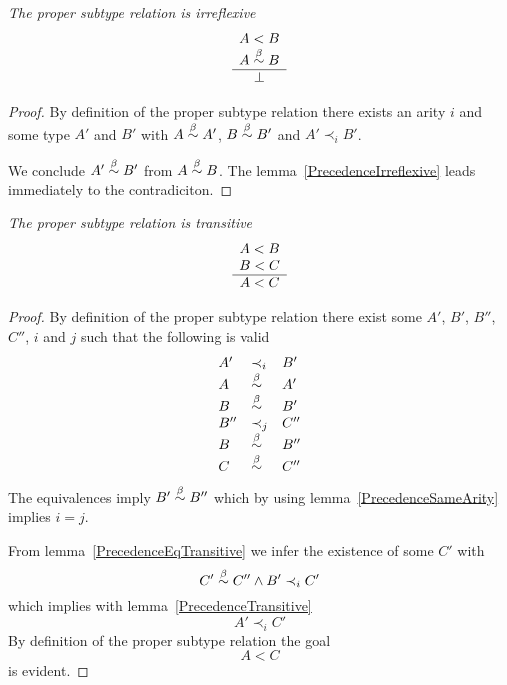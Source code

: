 \begin{theorem}
    \label{ProperSubtypeIrreflexive}
    \emph{The proper subtype relation is irreflexive}
    $$
    \begin{array}{c} 
        A < B
        \\
        A \stackrel{\beta}{\sim} B
     \\ \hline \perp\end{array}
    $$

    \begin{proof}
        By definition of the proper subtype relation there exists an arity $i$ and
        some type $A'$ and $B'$ with $A \stackrel{\beta}{\sim} A'$, $B \stackrel{\beta}{\sim} B'$ and $A'
        \prec_i B'$.

        We conclude $A' \stackrel{\beta}{\sim} B'$ from $A \stackrel{\beta}{\sim} B$. The
        lemma~\ref{PrecedenceIrreflexive} leads immediately to the
        contradiciton.
    \end{proof}
\end{theorem}





\begin{theorem}
    \label{ProperSubtypeTransitive}
    \emph{The proper subtype relation is transitive}
    $$
    \begin{array}{c} 
        A < B
        \\
        B < C
     \\ \hline A < C\end{array}
    $$

    \begin{proof}
        By definition of the proper subtype relation there exist some $A'$,
        $B'$, $B''$, $C''$, $i$ and $j$ such that the following is valid
        $$
        \begin{array}{lll}
            A' &\prec_i& B'
            \\
            A &\stackrel{\beta}{\sim}& A'
            \\
            B &\stackrel{\beta}{\sim}& B'
            \\
            B'' &\prec_j& C''
            \\
            B &\stackrel{\beta}{\sim}& B''
            \\
            C &\stackrel{\beta}{\sim}& C''
        \end{array}
        $$
        The equivalences imply $B' \stackrel{\beta}{\sim} B''$ which by using
        lemma~\ref{PrecedenceSameArity} implies $i = j$.

        From lemma~\ref{PrecedenceEqTransitive} we infer the existence of some
        $C'$ with
        $$
            C' \stackrel{\beta}{\sim} C'' \land B' \prec_i C'
        $$
        which implies with lemma~\ref{PrecedenceTransitive}
        $$
            A' \prec_i C'
        $$
        By definition of the proper subtype relation the goal
        $$
            A < C
        $$
        is evident.
    \end{proof}
\end{theorem}








